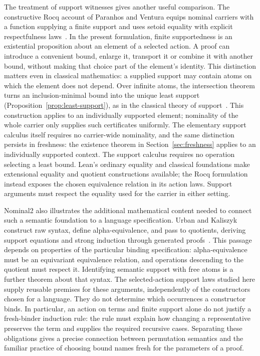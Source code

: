 The treatment of support witnesses gives another useful comparison.
The constructive Rocq account of Paranhos and Ventura equips nominal
carriers with a function supplying a finite support and uses setoid equality
with explicit respectfulness laws~\cite[Section~3]{paranhosVentura2025}.
In the present formulation, finite supportedness is an existential
proposition about an element of a selected action. A proof can introduce a
convenient bound, enlarge it, transport it or combine it with another bound,
without making that choice part of the element's identity. This distinction
matters even in classical mathematics: a supplied support may contain atoms
on which the element does not depend. Over infinite atoms, the intersection
theorem turns an inclusion-minimal bound into the unique least support
(Proposition~\ref{prop:least-support}), as in the classical theory of
support~\cite[Section~2.1]{pitts2013}. This construction applies to an
individually supported element; nominality of the whole carrier only supplies
such certificates uniformly. The elementary support calculus itself requires
no carrier-wide nominality, and the same distinction persists in freshness:
the existence theorem in Section~\ref{sec:freshness} applies to an individually
supported context. The support calculus requires
no operation selecting a least bound. Lean's ordinary
equality and classical foundations make extensional equality and quotient
constructions available; the Rocq formulation instead exposes the chosen
equivalence relation in its action laws. Support arguments must respect the
equality used for the carrier in either setting.

Nominal2 also illustrates the additional mathematical content needed to
connect such a semantic foundation to a language specification. Urban and
Kaliszyk construct raw syntax, define alpha-equivalence, and pass to
quotients, deriving support equations and strong induction through generated
proofs~\cite[Sections~4--7]{urbanKaliszyk2012}. This passage depends on
properties of the particular binding specification: alpha-equivalence must
be an equivariant equivalence relation, and operations descending to the
quotient must respect it. Identifying semantic support with free atoms is a
further theorem about that syntax. The selected-action support laws studied
here supply reusable premises for these arguments, independently of the
constructors chosen for a language. They do not determine which occurrences
a constructor binds. In particular, an action on terms and finite support
alone do not justify a fresh-binder induction rule: the rule must explain
how changing a representative preserves the term and supplies the required
recursive cases. Separating these obligations gives a precise connection
between permutation semantics and the familiar practice of choosing bound
names fresh for the parameters of a proof.
